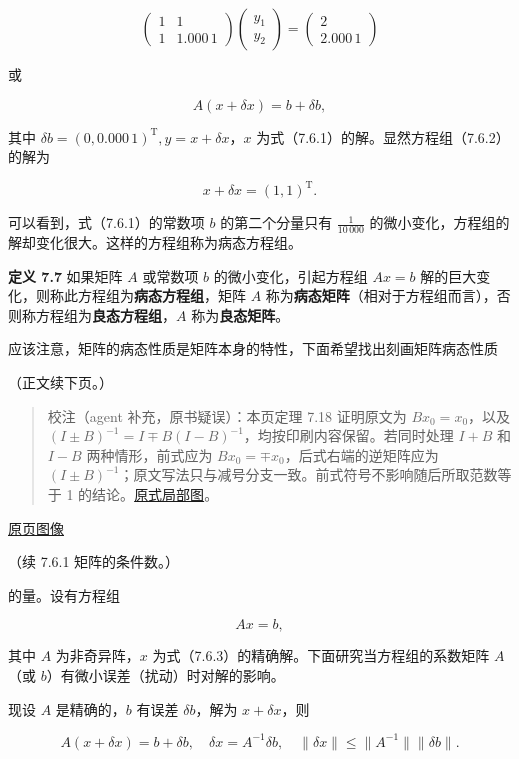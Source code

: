 \documentclass[
  10pt,
  fontset=fandol]{ctexart}
\begin{document}
\[
\begin{pmatrix}1&1\\1&1.000\,1\end{pmatrix}
\begin{pmatrix}y_1\\y_2\end{pmatrix}
=\begin{pmatrix}2\\2.000\,1\end{pmatrix}
\]

或

\[
A(x+\delta x)=b+\delta b,
\tag{7.6.2}
\]

其中 \(\delta b=(0,0.000\,1)^{\mathrm T},y=x+\delta x\)，\(x\) 为式（7.6.1）的解。显然方程组（7.6.2）的解为

\[
x+\delta x=(1,1)^{\mathrm T}.
\]

可以看到，式（7.6.1）的常数项 \(b\) 的第二个分量只有 \(\frac1{10\,000}\) 的微小变化，方程组的解却变化很大。这样的方程组称为病态方程组。

\textbf{定义 7.7} 如果矩阵 \(A\) 或常数项 \(b\) 的微小变化，引起方程组 \(Ax=b\) 解的巨大变化，则称此方程组为\textbf{病态方程组}，矩阵 \(A\) 称为\textbf{病态矩阵}（相对于方程组而言），否则称方程组为\textbf{良态方程组}，\(A\) 称为\textbf{良态矩阵}。

应该注意，矩阵的病态性质是矩阵本身的特性，下面希望找出刻画矩阵病态性质

（正文续下页。）

\begin{quote}
校注（agent 补充，原书疑误）：本页定理 7.18 证明原文为 \(Bx_0=x_0\)，以及 \((I\pm B)^{-1}=I\mp B(I-B)^{-1}\)，均按印刷内容保留。若同时处理 \(I+B\) 和 \(I-B\) 两种情形，前式应为 \(Bx_0=\mp x_0\)，后式右端的逆矩阵应为 \((I\pm B)^{-1}\)；原文写法只与减号分支一致。前式符号不影响随后所取范数等于 1 的结论。\href{../assets/ch07b/205-inverse-signs.png}{原式局部图}。
\end{quote}

\href{../../source-images/pdf-206.jpeg}{原页图像}

（续 7.6.1 矩阵的条件数。）

的量。设有方程组

\[
Ax=b,
\tag{7.6.3}
\]

其中 \(A\) 为非奇异阵，\(x\) 为式（7.6.3）的精确解。下面研究当方程组的系数矩阵 \(A\)（或 \(b\)）有微小误差（扰动）时对解的影响。

现设 \(A\) 是精确的，\(b\) 有误差 \(\delta b\)，解为 \(x+\delta x\)，则

\[
A(x+\delta x)=b+\delta b,\quad\delta x=A^{-1}\delta b,\quad\|\delta x\|\leqslant\|A^{-1}\|\|\delta b\|.
\tag{7.6.4}
\]
\end{document}
